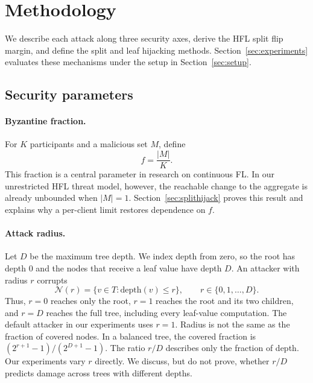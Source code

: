 \documentclass[11pt]{article}
\newcommand{\rev}[1]{#1}
\begin{document}
\section{Methodology}
\label{sec:methodology}

We describe each attack along three security axes, derive the HFL split flip margin, and define the split and leaf hijacking methods. Section~\ref{sec:experiments} evaluates these mechanisms under the setup in Section~\ref{sec:setup}.

\subsection{Security parameters}
\label{sec:parameters}

\paragraph{Byzantine fraction.}
For $K$ participants and a malicious set $M$, define
\begin{equation}
f = \frac{\lvert M\rvert}{K}.
\label{eq:fdef}
\end{equation}
This fraction is a central parameter in research on continuous FL. In our unrestricted HFL threat model, however, the reachable change to the aggregate is already unbounded when $\lvert M\rvert=1$. Section~\ref{sec:splithijack} proves this result and explains why a per-client limit restores dependence on $f$.

\paragraph{Attack radius.}
Let $D$ be the maximum tree depth. \rev{We index depth from zero, so the root has depth $0$ and the nodes that receive a leaf value have depth $D$.} An attacker with radius $r$ corrupts
\begin{equation}
\mathcal{N}(r)=\{v\in T:\mathrm{depth}(v)\leq r\},
\qquad r\in\{0,1,\ldots,D\}.
\label{eq:rdef}
\end{equation}
\rev{Thus, $r=0$ reaches only the root, $r=1$ reaches the root and its two children, and $r=D$ reaches the full tree, including every leaf-value computation. The default attacker in our experiments uses $r=1$.} Radius is not the same as the fraction of covered nodes. In a balanced tree, the covered fraction is \rev{$(2^{r+1}-1)/(2^{D+1}-1)$}. The ratio $r/D$ describes only the fraction of depth. Our experiments vary $r$ directly. We discuss, but do not prove, whether $r/D$ predicts damage across trees with different depths.
\end{document}

